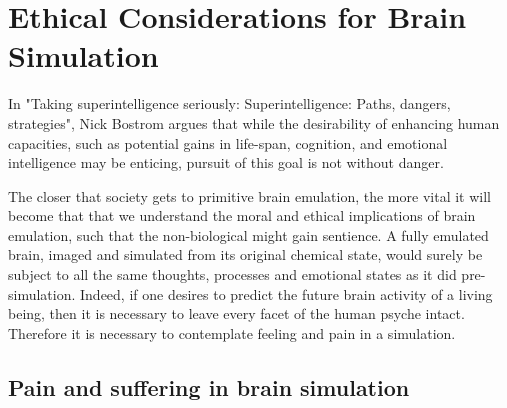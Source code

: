 

\chapter{Ethical Considerations for Brain Simulation}


In "Taking superintelligence seriously: Superintelligence: Paths, dangers,
strategies", Nick Bostrom argues that while the desirability of enhancing human
capacities, such as potential gains in life-span, cognition, and emotional
intelligence may be enticing, pursuit of this goal is not without danger.
\autocite{bostrom_superintelligence_2014}

The closer that society gets to primitive brain emulation, the more vital it
will become that that we understand the moral and ethical implications of brain
emulation, such that the non-biological might gain sentience. A fully emulated
brain, imaged and simulated from its original chemical state, would surely be
subject to all the same thoughts, processes and emotional states as it did
pre-simulation. Indeed, if one desires to predict the future brain activity of a
living being, then it is necessary to leave every facet of the human psyche
intact. Therefore it is necessary to contemplate feeling and pain in a simulation.

\section{Pain and suffering in brain simulation}

